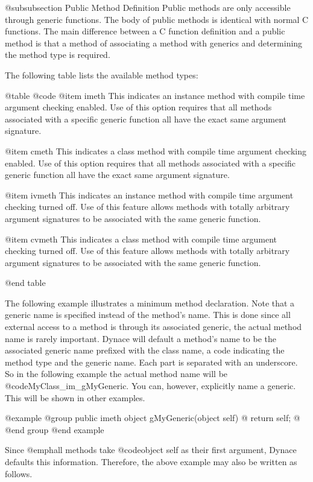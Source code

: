 @subsubsection Public Method Definition
Public methods are only accessible through generic functions.
The body of public methods is identical with normal C functions.
The main difference between a C function definition and a public
method is that a method of associating a method with generics
and determining the method type is required.

The following table lists the available method types:

@table @code
@item imeth
This indicates an instance method with compile time argument checking
enabled.  Use of this option requires that all methods associated
with a specific generic function all have the exact same argument
signature.

@item cmeth
This indicates a class method with compile time argument checking
enabled.  Use of this option requires that all methods associated with a
specific generic function all have the exact same argument signature.

@item ivmeth
This indicates an instance method with compile time argument checking
turned off.  Use of this feature allows methods with totally arbitrary
argument signatures to be associated with the same generic function.

@item cvmeth
This indicates a class method with compile time argument checking
turned off.  Use of this feature allows methods with totally arbitrary
argument signatures to be associated with the same generic function.


@end table

The following example illustrates a minimum method declaration.  Note
that a generic name is specified instead of the method's name.  This is
done since all external access to a method is through its associated
generic, the actual method name is rarely important.  Dynace will
default a method's name to be the associated generic name prefixed with
the class name, a code indicating the method type and the generic name.
Each part is separated with an underscore.  So in the following example
the actual method name will be @code{MyClass_im_gMyGeneric}.  You can,
however, explicitly name a generic.  This will be shown in other
examples.

@example
@group
public  imeth   object  gMyGeneric(object self)
@{
        return self;
@}
@end group
@end example


Since @emph{all} methods take @code{object self} as their first argument,
Dynace defaults this information.  Therefore, the above example may also
be written as follows.  


